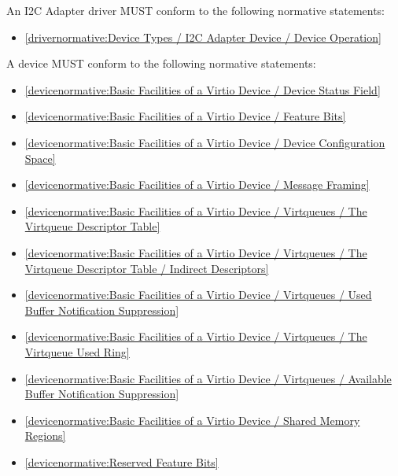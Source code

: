 An I2C Adapter driver MUST conform to the following normative statements:

\begin{itemize}
\item \ref{drivernormative:Device Types / I2C Adapter Device / Device Operation}
\end{itemize}

\label{sec:Conformance / Device Conformance}

A device MUST conform to the following normative statements:

\begin{itemize}
\item \ref{devicenormative:Basic Facilities of a Virtio Device / Device Status Field}
\item \ref{devicenormative:Basic Facilities of a Virtio Device / Feature Bits}
\item \ref{devicenormative:Basic Facilities of a Virtio Device / Device Configuration Space}
\item \ref{devicenormative:Basic Facilities of a Virtio Device / Message Framing}
\item \ref{devicenormative:Basic Facilities of a Virtio Device / Virtqueues / The Virtqueue Descriptor Table}
\item \ref{devicenormative:Basic Facilities of a Virtio Device / Virtqueues / The Virtqueue Descriptor Table / Indirect Descriptors}
\item \ref{devicenormative:Basic Facilities of a Virtio Device / Virtqueues / Used Buffer Notification Suppression}
\item \ref{devicenormative:Basic Facilities of a Virtio Device / Virtqueues / The Virtqueue Used Ring}
\item \ref{devicenormative:Basic Facilities of a Virtio Device / Virtqueues / Available Buffer Notification Suppression}
\item \ref{devicenormative:Basic Facilities of a Virtio Device / Shared Memory Regions}
\item \ref{devicenormative:Reserved Feature Bits}
\end{itemize}

\label{sec:Conformance / Device Conformance / PCI Device Conformance}

